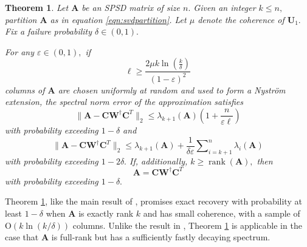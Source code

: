 \documentclass[11pt,letterpaper,twoside,reqno,nosumlimits]{amsart}
\def\pinv{\dagger}
\def\transp{T}
\newcommand{\mat}[1]{\ensuremath{\mathbf{#1}}}
\newcommand{\snorm}[1]{\ensuremath{\big\|#1\big\|_2}}
\DeclareMathOperator{\rank}{rank}
\newtheorem{thm}{Theorem}
\theoremstyle{remark}
\newtheorem{remark}{Remark}
\begin{document}
\begin{thm}
 Let $\mat{A}$ be an SPSD matrix of size $n.$ Given an integer $k \leq n,$ partition $\mat{A}$ as in equation \eqref{eqn:svdpartition}. Let
$\mu$ denote the coherence of $\mat{U}_1.$ Fix a failure probability $\delta \in (0,1).$ 

For any $\varepsilon \in (0,1),$ if
\[
 \ell \geq \frac{2 \mu k \ln\left(\frac{k}{\delta}\right)}{(1-\varepsilon)^2}
\]
columns of $\mat{A}$ are chosen uniformly at random and used to form a Nystr\"om extension, the spectral norm error of the approximation satisfies
\[
\snorm{\mat{A} - \mat{C} \mat{W}^\pinv \mat{C}^\transp} \leq \lambda_{k+1}(\mat{A}) \left(1 + \frac{ n}{\varepsilon \ell} \right) 
\]
with probability exceeding $1-\delta$ and
\[
\snorm{\mat{A} - \mat{C} \mat{W}^\pinv \mat{C}^\transp} \leq \lambda_{k+1}(\mat{A}) + \frac{1}{\delta \varepsilon} \sum\nolimits_{i=k+1}^n \lambda_i(\mat{A})
\]
with probability exceeding $1-2\delta.$
If, additionally, $k \geq \rank(\mat{A}),$ then
\[
 \mat{A} = \mat{C} \mat{W}^\pinv \mat{C}^\transp
\]
with probability exceeding $1-\delta.$

\label{thm:uniformnystromerror}
\end{thm}

 Theorem \ref{thm:uniformnystromerror}, like the main result of \cite{TR10}, promises exact recovery with probability at least $1-\delta$ when $\mat{A}$ is exactly rank $k$ and has small coherence, with a sample of $\mathrm{O}(k \ln (k/\delta))$ columns. Unlike the result in \cite{TR10}, Theorem \ref{thm:uniformnystromerror} is applicable in the case that $\mat{A}$ is full-rank but has a sufficiently fastly decaying spectrum.


\end{document}
